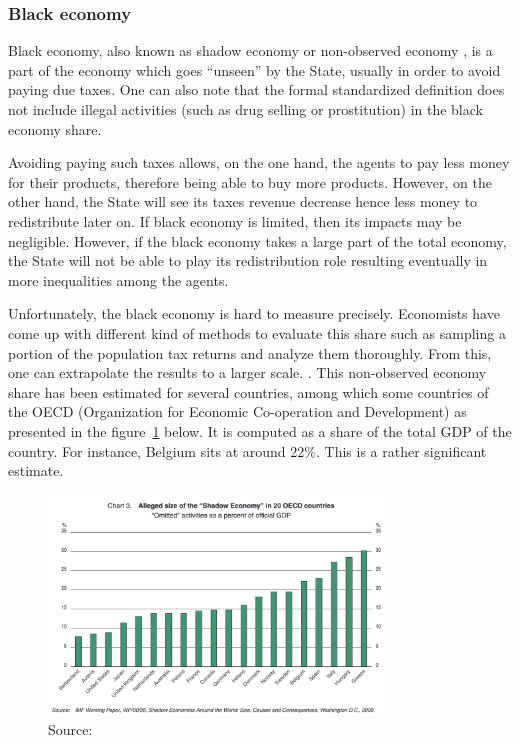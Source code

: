     \subsubsection{Black economy}
    Black economy, also known as shadow economy or non-observed economy \cite{oecdBlack}, is a part of the economy which goes ``unseen'' by the State, usually in order to avoid paying due taxes. One can also note that the formal standardized definition does not include illegal activities (such as drug selling or prostitution) in the black economy share. \cite{pyle1989tax} 
    
    Avoiding paying such taxes allows, on the one hand, the agents to pay less money for their products, therefore being able to buy more products. However, on the other hand, the State will see its taxes revenue decrease hence less money to redistribute later on. 
    If black economy is limited, then its impacts may be negligible. However, if the black economy takes a large part of the total economy, the State will not be able to play its redistribution role resulting eventually in more inequalities among the agents.

    Unfortunately, the black economy is hard to measure precisely. Economists have come up with different kind of methods to evaluate this share such as sampling a portion of the population tax returns and analyze them thoroughly. From this, one can extrapolate the results to a larger scale. \cite{pyle1989tax}. This non-observed economy share has been estimated for several countries, among which some countries of the OECD (Organization for Economic Co-operation and Development) as presented in the figure~\ref{fig:black_economy_oecd} below. It is computed as a share of the total GDP of the country. For instance, Belgium sits at around 22\%. This is a rather significant estimate.
    
    \begin{figure}[H]
        \centering
        \includegraphics[width=0.8\textwidth]{img/black economy OECD.png}
        \caption{Source: \cite{oecdBlack}}
        \label{fig:black_economy_oecd}
    \end{figure}

